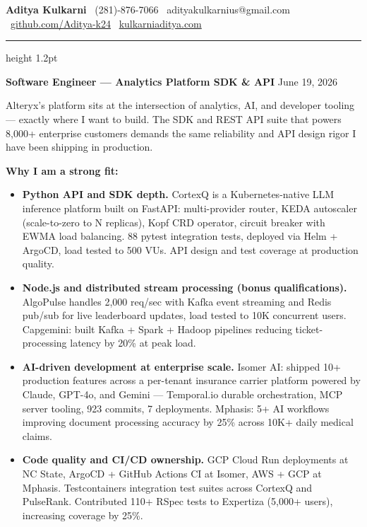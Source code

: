 \documentclass[11pt,letterpaper]{article}
\begin{document}
\thispagestyle{empty}

{\large \textbf{Aditya Kulkarni}} \hfill
{\color{AlteryxPurple} \faPhone\ (281)-876-7066} \quad
{\color{AlteryxPurple} \faEnvelope\ adityakulkarnius@gmail.com} \\
{\color{AlteryxPurple} \faGithub\ \href{https://github.com/Aditya-k24}{github.com/Aditya-k24}} \quad
{\color{AlteryxPurple} \faGlobe\ \href{https://www.kulkarniaditya.com}{kulkarniaditya.com}}

\vspace{6pt}
{\color{AlteryxPurple}\hrule height 1.2pt}
\vspace{12pt}

{\color{AlteryxPurple} \textbf{Software Engineer --- Analytics Platform SDK \& API}} \hfill June 19, 2026

\vspace{10pt}

Alteryx's platform sits at the intersection of analytics, AI, and developer tooling --- exactly where I want to build. The SDK and REST API suite that powers 8,000+ enterprise customers demands the same reliability and API design rigor I have been shipping in production.

\vspace{6pt}

\textbf{Why I am a strong fit:}

\begin{itemize}
  \item[\faAngleRight] \textbf{Python API and SDK depth.} CortexQ is a Kubernetes-native LLM inference platform built on FastAPI: multi-provider router, KEDA autoscaler (scale-to-zero to N replicas), Kopf CRD operator, circuit breaker with EWMA load balancing. 88 pytest integration tests, deployed via Helm + ArgoCD, load tested to 500 VUs. API design and test coverage at production quality.

  \item[\faAngleRight] \textbf{Node.js and distributed stream processing (bonus qualifications).} AlgoPulse handles 2,000 req/sec with Kafka event streaming and Redis pub/sub for live leaderboard updates, load tested to 10K concurrent users. Capgemini: built Kafka + Spark + Hadoop pipelines reducing ticket-processing latency by 20\% at peak load.

  \item[\faAngleRight] \textbf{AI-driven development at enterprise scale.} Isomer AI: shipped 10+ production features across a per-tenant insurance carrier platform powered by Claude, GPT-4o, and Gemini --- Temporal.io durable orchestration, MCP server tooling, 923 commits, 7 deployments. Mphasis: 5+ AI workflows improving document processing accuracy by 25\% across 10K+ daily medical claims.

  \item[\faAngleRight] \textbf{Code quality and CI/CD ownership.} GCP Cloud Run deployments at NC State, ArgoCD + GitHub Actions CI at Isomer, AWS + GCP at Mphasis. Testcontainers integration test suites across CortexQ and PulseRank. Contributed 110+ RSpec tests to Expertiza (5,000+ users), increasing coverage by 25\%.
\end{itemize}
\end{document}
